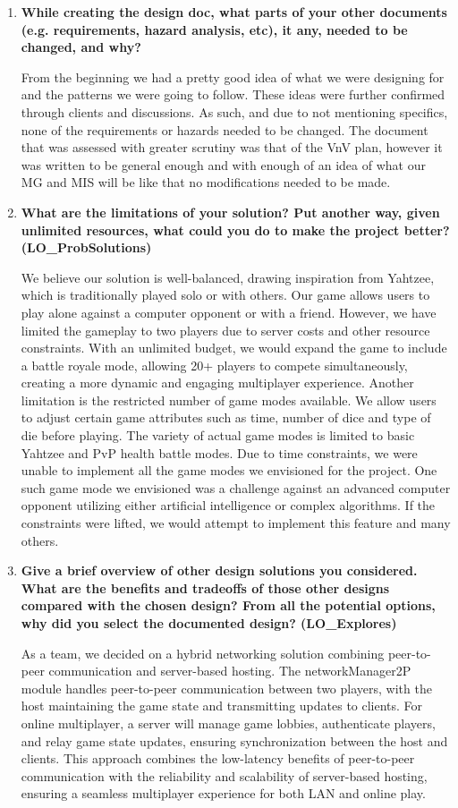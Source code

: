 \documentclass[12pt, titlepage]{article}
\begin{document}
\begin{enumerate}
  \item \textbf{While creating the design doc, what parts of your other documents (e.g.
  requirements, hazard analysis, etc), it any, needed to be changed, and why?}

  From the beginning we had a pretty good idea of what we were designing for and the patterns we were going to follow. These ideas were further confirmed through clients and discussions. As such, and due to not mentioning specifics, none of the requirements or hazards needed to be changed. The document that was assessed with greater scrutiny was that of the VnV plan, however it was written to be general enough and with enough of an idea of what our MG and MIS will be like that no modifications needed to be made.

  \item \textbf{What are the limitations of your solution?  Put another way, given
  unlimited resources, what could you do to make the project better? (LO\_ProbSolutions)}

  We believe our solution is well-balanced, drawing inspiration from Yahtzee, which is traditionally played solo or with others. Our game allows users to play alone against a computer opponent or with a friend. However, we have limited the gameplay to two players due to server costs and other resource constraints. With an unlimited budget, we would expand the game to include a battle royale mode, allowing 20+ players to compete simultaneously, creating a more dynamic and engaging multiplayer experience. Another limitation is the restricted number of game modes available. We allow users to adjust certain game attributes such as time, number of dice and type of die before playing. The variety of actual game modes is limited to basic Yahtzee and PvP health battle modes. Due to time constraints, we were unable to implement all the game modes we envisioned for the project. One such game mode we envisioned was a challenge against an advanced computer opponent utilizing either artificial intelligence or complex algorithms. If the constraints were lifted, we would attempt to implement this feature and many others.
  
  \item \textbf{Give a brief overview of other design solutions you considered.  What
  are the benefits and tradeoffs of those other designs compared with the chosen
  design?  From all the potential options, why did you select the documented design?
  (LO\_Explores)}

  As a team, we decided on a hybrid networking solution combining peer-to-peer communication and server-based hosting. The networkManager2P module handles peer-to-peer communication between two players, with the host maintaining the game state and transmitting updates to clients. For online multiplayer, a server will manage game lobbies, authenticate players, and relay game state updates, ensuring synchronization between the host and clients. This approach combines the low-latency benefits of peer-to-peer communication with the reliability and scalability of server-based hosting, ensuring a seamless multiplayer experience for both LAN and online play.


\end{enumerate}
\end{document}
